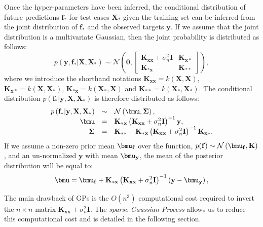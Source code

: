 \documentclass[useAMS,usenatbib,fleqn]{mn2e}
\begin{document}
Once the hyper-parameters have been inferred, the conditional distribution of future predictions $\mathbf{f}_{*}$ for test cases $\mathbf{X}_{*}$ given the training set can be inferred from the joint distribution of $\mathbf{f}_{*}$ and the observed targets $\mathbf{y}$. If we assume that the joint distribution is a multivariate Gaussian, then the joint probability is distributed as follows:
\begin{equation}
p\left ( \mathbf{y},\mathbf{f}_{*}|\mathbf{X},\mathbf{X}_{*}\right) \sim \mathcal{N} \left ( \mathbf{0}, \begin{bmatrix}\mathbf{K_{xx}}+\sigma_{n}^{2}\mathbf{I} & \mathbf{K_{x*}}\\\mathbf{K_{*x}} & \mathbf{K_{**}} \end{bmatrix}\right ),
\end{equation}
where we introduce the shorthand notations $\mathbf{K_{xx}}=k\left(\mathbf{X},\mathbf{X}\right)$, $\mathbf{K_{x*}}=k\left(\mathbf{X},\mathbf{X}_{*}\right)$, $\mathbf{K_{*x}}=k\left(\mathbf{X}_{*},\mathbf{X}\right)$ and $\mathbf{K_{**}}=k\left(\mathbf{X}_{*},\mathbf{X}_{*}\right)$. The conditional distribution $p\left(\mathbf{f}_{*}|\mathbf{y},\mathbf{X},\mathbf{X}_{*}\right)$ is therefore distributed as follows:
\begin{equation}
\begin{array}{rcl}
p\left(\mathbf{f}_{*}|\mathbf{y},\mathbf{X},\mathbf{X}_{*}\right)		&	\sim		&	\mathcal{N} \left ( \bmu, \mathbf\Sigma \right ),\\
\bmu			&	=		&	\mathbf{K_{*x}}\left(\mathbf{K_{xx}}+\sigma_{n}^{2}\mathbf{I}\right)^{-1}\mathbf{y},\\
\mathbf\Sigma		&	=		&	\mathbf{K_{**}}-\mathbf{K_{*x}}\left(\mathbf{K_{xx}}+\sigma_{n}^{2}\mathbf{I}\right)^{-1}\mathbf{K_{x*}}.
\end{array}
\label{eq-posterior-of-f}
\end{equation}
If we assume a non-zero prior mean $\bmu_{\mathbf{f}}$ over the function, $p(\mathbf{f})\sim\mathcal{N}\left(\bmu_{\mathbf{f}},\mathbf{K}\right)$, and an un-normalized $\mathbf{y}$ with mean $\bmu_{\mathbf{y}}$, the mean of the posterior distribution will be equal to:
\begin{equation}
\bmu	 = \bmu_{\mathbf{f}}+\mathbf{K_{*x}}\left(\mathbf{K_{xx}}+\sigma_{n}^{2}\mathbf{I}\right)^{-1}\left(\mathbf{y}-\bmu_{\mathbf{y}}\right),
\label{eq-conditional-distribution}
\end{equation}

The main drawback of GPs is the $O\left(n^{3}\right)$ computational cost required to invert the $n\times n$ matrix $\mathbf{K_{xx}}+\sigma_{n}^{2}\mathbf{I}$. The \emph{sparse Gaussian Process} allows us to reduce this computational cost and is detailed in the following section.
\end{document}
